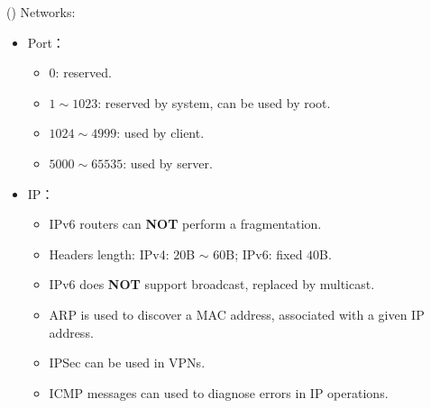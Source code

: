 \begin{theorem}{()} Networks: \begin{itemize}
        \item Port： \begin{itemize}
            \item $0$: reserved.
            \item $1 \sim 1023$: reserved by system, can be used by root.
            \item $1024 \sim 4999$: used by client.
            \item $5000 \sim 65535$: used by server. 
        \end{itemize}
        \item IP： \begin{itemize}
            \item IPv6 routers can \textbf{NOT} perform a fragmentation.
            \item Headers length: IPv4: $20$B $\sim$ $60$B; IPv6: fixed $40$B.
            \item IPv6 does \textbf{NOT} support broadcast, replaced by multicast.
            \item ARP is used to discover a MAC address, associated with a given IP address.
            \item IPSec can be used in VPNs.
            \item ICMP messages can used to diagnose errors in IP operations.
        \end{itemize}
    \end{itemize}
\end{theorem}

